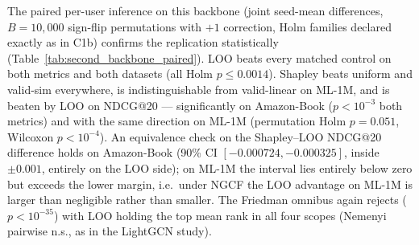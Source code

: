 \documentclass[pdflatex,sn-mathphys-num]{sn-jnl}
\begin{document}
The paired per-user inference on this backbone (joint seed-mean differences, $B=10{,}000$ sign-flip permutations with $+1$ correction, Holm families declared exactly as in C1b) confirms the replication statistically (Table~\ref{tab:second_backbone_paired}). LOO beats every matched control on both metrics and both datasets (all Holm $p\le0.0014$). Shapley beats uniform and valid-sim everywhere, is indistinguishable from valid-linear on ML-1M, and is beaten by LOO on NDCG@20 --- significantly on Amazon-Book ($p<10^{-3}$ both metrics) and with the same direction on ML-1M (permutation Holm $p=0.051$, Wilcoxon $p<10^{-4}$). An equivalence check on the Shapley--LOO NDCG@20 difference holds on Amazon-Book (90\% CI $[-0.000724,-0.000325]$, inside $\pm0.001$, entirely on the LOO side); on ML-1M the interval lies entirely below zero but exceeds the lower margin, i.e.\ under NGCF the LOO advantage on ML-1M is larger than negligible rather than smaller. The Friedman omnibus again rejects ($p<10^{-35}$) with LOO holding the top mean rank in all four scopes (Nemenyi pairwise n.s., as in the LightGCN study).
\end{document}
